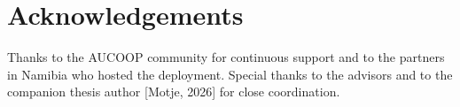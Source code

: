 \hypertarget{acknowledgements}{%
\section{Acknowledgements}\label{acknowledgements}}

Thanks to the AUCOOP community for continuous support and to the
partners in Namibia who hosted the deployment. Special thanks to the
advisors and to the companion thesis author {[}Motje, 2026{]} for close
coordination.
